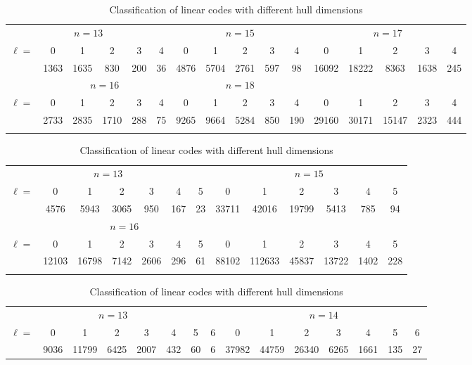 \documentclass[a4paper,11pt]{article}
\begin{document}
\begin{table}
\caption{Classification of linear codes with different hull dimensions\label{table1}}
{\footnotesize
\begin{tabular}{r|c|c|c|c|c|c|c|c|c|c|c|c|c|c|c}
\hline\noalign{\smallskip}
\multicolumn{16}{c}{$q=2$, $k=4$}\\
\hline
\multicolumn{6}{c|}{$n=13$}& \multicolumn{5}{c|}{$n=15$}& \multicolumn{5}{c}{$n=17$}\\
\hline
$\ell=$    &  0 &  1& 2& 3& 4&0& 1& 2& 3& 4&0& 1& 2& 3& 4\\
\hline
 &	1363&	1635&	830&	200&	36&	4876&5704&2761&597&98&	16092&	18222&	8363& 1638&	245\\
\noalign{\smallskip}\hline
\multicolumn{6}{c|}{$n=14$}& \multicolumn{5}{c|}{$n=16$}& \multicolumn{5}{c}{$n=18$}\\
\hline
$\ell=$    &  0 &  1& 2& 3& 4&0& 1& 2& 3& 4&0& 1& 2& 3& 4\\
\hline
 &2733&	2835&	1710& 288&	75&	9265&	9664&	5284&	850&	190&29160&30171&15147&2323&444\\
\noalign{\smallskip}\hline
\end{tabular}
\begin{tabular}{r|c|c|c|c|c|c|c|c|c|c|c|c}
\hline\noalign{\smallskip}
\multicolumn{13}{c}{$q=2$, $k=5$}\\
\hline
\multicolumn{7}{c|}{$n=13$}& \multicolumn{6}{c}{$n=15$}\\
\hline
$\ell=$    &  0 &  1& 2& 3& 4&5&0& 1& 2& 3& 4&5\\
\hline
 &	4576&	5943&	3065&	950&	167&	23&33711&42016&19799&5413&	785&	94\\
\noalign{\smallskip}\hline
\multicolumn{7}{c|}{$n=14$}& \multicolumn{6}{c}{$n=16$}\\
\hline
$\ell=$    &  0 &  1& 2& 3& 4&5&0& 1& 2& 3& 4&5\\
\hline
 &12103&16798&7142&2606&	296&	61&	88102&	112633&	45837&13722&1402&228\\
\noalign{\smallskip}\hline
\end{tabular}
\begin{tabular}{r|c|c|c|c|c|c|c|c|c|c|c|c|c|c}
\hline\noalign{\smallskip}
\multicolumn{15}{c}{$q=2$, $k=6$}\\
\hline
\multicolumn{8}{c|}{$n=13$}& \multicolumn{7}{c}{$n=14$}\\
\hline
$\ell=$    &  0 &  1& 2& 3& 4&5&6&0& 1& 2& 3& 4&5&6\\
\hline
 &	9036&	11799&	6425&	2007&	432&60&6&37982&44759&26340&6265&	1661&135&27\\

\end{tabular}}
\end{table}
\end{document}
